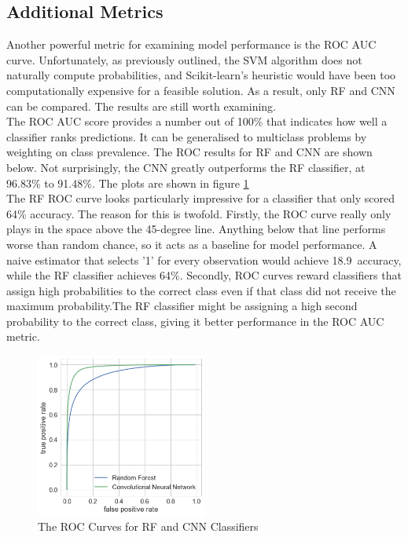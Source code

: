 \documentclass[12pt]{article}
\begin{document}
\subsection{Additional Metrics}

Another powerful metric for examining model performance is the ROC AUC curve. Unfortunately, as previously outlined, the SVM algorithm does not naturally compute probabilities, and Scikit-learn's heuristic would have been too computationally expensive for a feasible solution. As a result, only RF and CNN can be compared. The results are still worth examining.\\

The ROC AUC score provides a number out of 100\% that indicates how well a classifier ranks predictions. It can be generalised to multiclass problems by weighting on class prevalence. The ROC results for RF and CNN are shown below. Not surprisingly, the CNN greatly outperforms the RF classifier, at 96.83\% to 91.48\%. The plots are shown in figure \ref{img:rocplot}\\

The RF ROC curve looks particularly impressive for a classifier that only scored 64\% accuracy. The reason for this is twofold. Firstly, the ROC curve really only plays in the space above the 45-degree line. Anything below that line performs worse than random chance, so it acts as a baseline for model performance. A naive estimator that selects '1' for every observation would achieve 18.9\ accuracy, while the RF classifier achieves 64\%. Secondly, ROC curves reward classifiers that assign high probabilities to the correct class even if that class did not receive the maximum probability.The RF classifier might be assigning a high second probability to the correct class, giving it better performance in the ROC AUC metric.\\

\begin{figure}[h]
  \caption{The ROC Curves for RF and CNN Classifiers}
  \label{img:rocplot}
\centering
\includegraphics[width=0.5\textwidth]{images/roc_curves.png}
\end{figure}
\end{document}
